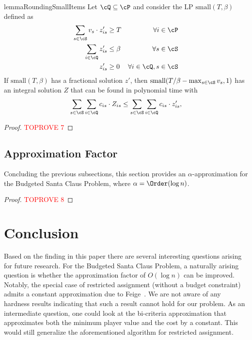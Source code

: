\documentclass[a4paper,USenglish,cleveref,thm-restate]{lipics-v2021}
\begin{document}
\begin{restatable}{lemma}{RoundingSmallItems}
    \label{lem:rounding-small-items}
    Let $\cQ \subseteq \cP$ and consider the LP $\mathrm{small}(T, \beta)$ defined as
    \begin{align*}
        \sum_{s\in \cS} v_s \cdot z'_{is} &\ge T &\forall i\in\cP \\
        \sum_{i\in \cQ} z'_{is} &\le \beta &\forall s\in\cS\\
        z'_{is} &\ge 0 &\forall i\in \cQ, s\in \cS
    \end{align*}
    If $\mathrm{small}(T, \beta)$ has a fractional solution $z'$,
    then $\mathrm{small}(T/\beta - \max_{s\in\cS} v_s, 1)$ has an integral solution $Z$ that can be found in polynomial time with
    \begin{equation*}
       \sum_{s\in\cS}\sum_{i\in\cQ} c_{is}\cdot Z_{is}     
       \le \sum_{s\in\cS}\sum_{i\in\cQ} c_{is}\cdot z'_{is},
    \end{equation*}
\end{restatable}
\begin{proof}\textcolor{red}{TOPROVE 7}\end{proof}


\subsection{Approximation Factor}
Concluding the previous subsections, this section provides an $\alpha$-approximation for the Budgeted Santa Claus Problem, where $\alpha = \Order(\log n)$. 
\SCapprox*
\begin{proof}\textcolor{red}{TOPROVE 8}\end{proof}
 \section{Conclusion}
Based on the finding in this paper there are several interesting questions arising for future research.
For the Budgeted Santa Claus Problem, a naturally arising question is whether the approximation factor of
$O(\log n)$ can be improved. Notably, the special case of restricted assignment (without a budget constraint)
admits a constant approximation due to Feige~\cite{Feige08}.
We are not aware of any hardness
results indicating that such a result cannot hold for our problem. As an intermediate question,
one could look at the bi-criteria approximation that approximates both the minimum player value and the cost by a constant. This would still generalize the aforementioned algorithm for restricted assignment.
\end{document}
